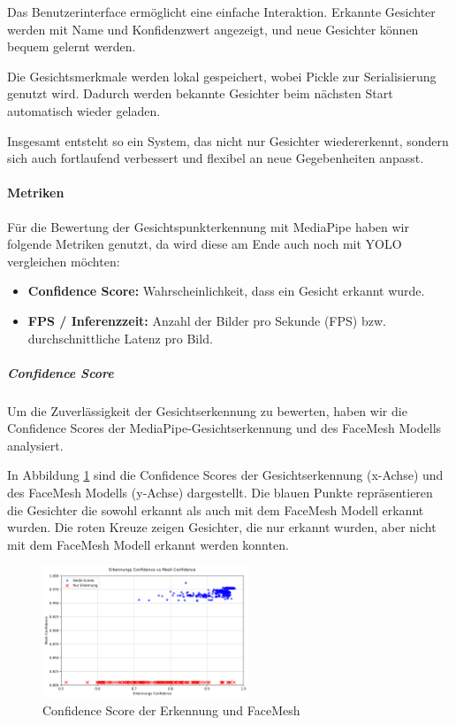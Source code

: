Das Benutzerinterface ermöglicht eine einfache Interaktion.
Erkannte Gesichter werden mit Name und Konfidenzwert angezeigt, und neue Gesichter können bequem gelernt werden.

Die Gesichtsmerkmale werden lokal gespeichert, wobei Pickle zur Serialisierung genutzt wird. Dadurch werden bekannte Gesichter beim nächsten Start automatisch wieder geladen.

Insgesamt entsteht so ein System, das nicht nur Gesichter wiedererkennt, sondern sich auch fortlaufend verbessert und flexibel an neue Gegebenheiten anpasst.

\paragraph{Metriken}
Für die Bewertung der Gesichtspunkterkennung mit MediaPipe haben wir folgende Metriken genutzt, da wird diese am Ende auch noch mit YOLO vergleichen möchten:
\begin{itemize}
    \item \textbf{Confidence Score:} Wahrscheinlichkeit, dass ein Gesicht erkannt wurde.
    \item \textbf{FPS / Inferenzzeit:} Anzahl der Bilder pro Sekunde (FPS) bzw. durchschnittliche Latenz pro Bild.
\end{itemize}

\subparagraph{Confidence Score} 

Um die Zuverlässigkeit der Gesichtserkennung zu bewerten, haben wir die Confidence Scores der MediaPipe-Gesichtserkennung und des FaceMesh Modells analysiert.

In Abbildung \ref{fig:confidence_score_mediapipe} sind die Confidence Scores der Gesichtserkennung (x-Achse) und des FaceMesh Modells (y-Achse) dargestellt. Die blauen Punkte repräsentieren die Gesichter die sowohl erkannt als auch mit dem FaceMesh Modell erkannt wurden. 
Die roten Kreuze zeigen Gesichter, die nur erkannt wurden, aber nicht mit dem FaceMesh Modell erkannt werden konnten.

\begin{figure}[ht]
    \centering
    \includegraphics[width=0.55\textwidth]{data/Detection_vs_Mesh_Confidence.png}
    \caption{Confidence Score der Erkennung und FaceMesh}
    \label{fig:confidence_score_mediapipe}
\end{figure}

